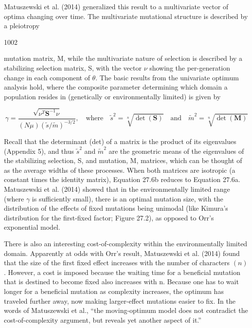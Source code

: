 \documentclass{article}
\begin{document}
Matuszewski et al. (2014) generalized this result to a multivariate vector of optima changing over time. The multivariate mutational structure is described by a pleiotropy

1002

mutation matrix, M, while the multivariate nature of selection is described by a stabilizing selection matrix, S, with the vector  $ \nu $ showing the per-generation change in each component of  $ \theta $. The basic results from the univariate optimum analysis hold, where the composite parameter determining which domain a population resides in (genetically or environmentally limited) is given by

\begin{equation}
\gamma=\frac{\sqrt{\nu^{T}\mathbf{S}^{-1}\nu}}{(N\mu)(\widetilde{s}/\widetilde{m})^{-3/2}},\quad\mathrm{w h e r e}\quad\widetilde{s}^{2}=\sqrt[n]{\operatorname{d e t}(\mathbf{S})}\quad\mathrm{a n d}\quad\widetilde{m}^{2}=\sqrt[n]{\operatorname{d e t}(\mathbf{M})}
\tag{27.6b}
\label{eq:27_6b}
\end{equation}

Recall that the determinant (det) of a matrix is the product of its eigenvalues (Appendix 5), and thus  $ \tilde{s}^{2} $ and  $ \tilde{m}^{2} $ are the geometric means of the eigenvalues of the stabilizing selection, S, and mutation, M, matrices, which can be thought of as the average widths of these processes. When both matrices are isotropic (a constant times the identity matrix), Equation 27.6b reduces to Equation 27.6a. Matuszewski et al. (2014) showed that in the environmentally limited range (where  $ \gamma $ is sufficiently small), there is an optimal mutation size, with the distribution of the effects of fixed mutations being unimodal (like Kimura's distribution for the first-fixed factor; Figure 27.2), as opposed to Orr's exponential model.

There is also an interesting cost-of-complexity within the environmentally limited domain. Apparently at odds with Orr's result, Matuszewski et al. (2014) found that the size of the first fixed effect increases with the number of characters  $ (n) $. However, a cost is imposed because the waiting time for a beneficial mutation that is destined to become fixed also increases with n. Because one has to wait longer for a beneficial mutation as complexity increases, the optimum has traveled further away, now making larger-effect mutations easier to fix. In the words of Matuszewski et al., “the moving-optimum model does not contradict the cost-of-complexity argument, but reveals yet another aspect of it.”
\end{document}
